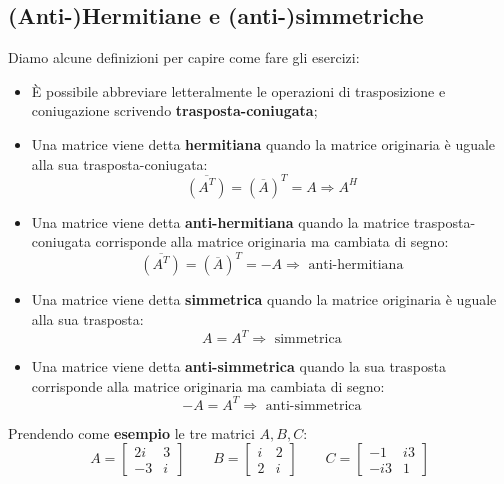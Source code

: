 \documentclass[a4paper]{article}
\begin{document}
	\subsection{(Anti-)Hermitiane e (anti-)simmetriche}
	
	Diamo alcune definizioni per capire come fare gli esercizi:
	\begin{itemize}
		\item È possibile abbreviare letteralmente le operazioni di trasposizione e coniugazione scrivendo \textbf{trasposta-coniugata};
		
		\item Una matrice viene detta \textcolor{Red3}{\textbf{hermitiana}} quando la matrice originaria è uguale alla sua trasposta-coniugata:
		\begin{equation*}
			\overline{\left(A^{T}\right)} = \left(\overline{A}\right)^{T} = A \Longrightarrow A^{H}
		\end{equation*}
		
		\item Una matrice viene detta \textcolor{Red3}{\textbf{anti-hermitiana}} quando la matrice trasposta-coniugata corrisponde alla matrice originaria ma cambiata di segno:
		\begin{equation*}
			\overline{\left(A^{T}\right)} = \left(\overline{A}\right)^{T} = -A \Longrightarrow \text{ anti-hermitiana}
		\end{equation*}
		
		\item Una matrice viene detta \textcolor{Red3}{\textbf{simmetrica}} quando la matrice originaria è uguale alla sua trasposta:
		\begin{equation*}
			A = A^{T} \Longrightarrow \text{ simmetrica}
		\end{equation*}
		
		\item Una matrice viene detta \textcolor{Red3}{\textbf{anti-simmetrica}} quando la sua trasposta corrisponde alla matrice originaria ma cambiata di segno:
		\begin{equation*}
			-A = A^{T} \Longrightarrow \text{ anti-simmetrica}
		\end{equation*}
	\end{itemize}
	Prendendo come \textcolor{Green4}{\textbf{esempio}} le tre matrici $A,B,C$:
	\begin{equation*}
		A = \begin{bmatrix}
			2i 	& 3		\\
			-3	& i
		\end{bmatrix} \hspace{2em}
		B = \begin{bmatrix}
			i 	& 2		\\
			2	& i
		\end{bmatrix} \hspace{2em}
		C = \begin{bmatrix}
			-1 	& i3	\\
			-i3	& 1
		\end{bmatrix}
	\end{equation*}
\end{document}
